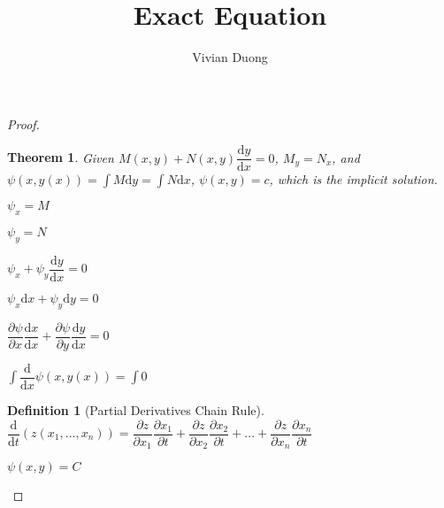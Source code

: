 \documentclass{article}
\title{Exact Equation}
\author{Vivian Duong}
\date{}
\newtheorem{definition}{Definition}
\newtheorem{theorem}{Theorem}[section]
\begin{document}
\begin{proof}
\begin{theorem}
Given $M(x,y) + N(x,y)\dfrac{\mathrm{d}y}{\mathrm{d}x} = 0$, $M_y=N_x$, and $\psi (x,y(x)) = \int M\mathrm{d}y = \int N\mathrm{d}x$, $\psi(x,y) = c$, which is the implicit solution.
\end{theorem}

\begin{center}
$\psi_x = M$

$\psi_y = N$

$\psi_x + \psi_y\dfrac{\mathrm{d}y}{\mathrm{d}x} = 0$


$\psi_x\mathrm{d}x + \psi_y\mathrm{d}y = 0$


$\dfrac{\partial \psi}{\partial x}\dfrac{\mathrm{d}x}{\mathrm{d}x} + \dfrac{\partial \psi}{\partial y}\dfrac{\mathrm{d}y}{\mathrm{d}x} =0$

$\int \dfrac{\mathrm{d}}{\mathrm{d}x} \psi(x,y(x)) = \int 0$
\end{center}
\begin{flushright}
\begin{definition}[Partial Derivatives Chain Rule]


$\dfrac{\mathrm{d}}{\mathrm{d}t}(z(x_1,...,x_n)) = \dfrac{\partial z}{\partial x_1}\dfrac{\partial x_1}{\partial t} + \dfrac{\partial z}{\partial x_2}\dfrac{\partial x_2}{\partial t} + ... + \dfrac{\partial z}{\partial x_n}\dfrac{\partial x_n}{\partial t}$

\end{definition}
\end{flushright}
\begin{center}
$\psi (x,y) = C$
\end{center}

\end{proof}
\end{document}
